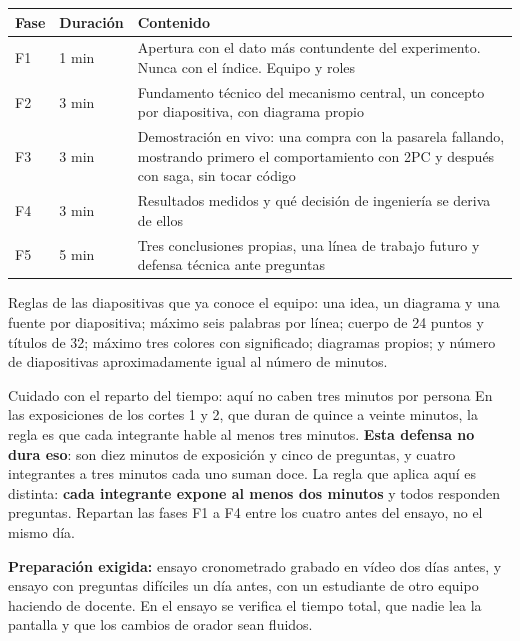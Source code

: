 \documentclass[11pt,a4paper]{article}
\begin{document}
	\begin{center}
		\small
		\begin{tabular}{@{}p{1.1cm}p{3.5cm}p{10.3cm}@{}}
			\toprule
			\textbf{Fase} & \textbf{Duración} & \textbf{Contenido} \\
			\midrule
			F1 & 1 min & Apertura con el dato más contundente del experimento. Nunca con el índice. Equipo y roles \\
			F2 & 3 min & Fundamento técnico del mecanismo central, un concepto por diapositiva, con diagrama propio \\
			F3 & 3 min & Demostración en vivo: una compra con la pasarela fallando, mostrando primero el comportamiento con 2PC y después con saga, sin tocar código \\
			F4 & 3 min & Resultados medidos y qué decisión de ingeniería se deriva de ellos \\
			F5 & 5 min & Tres conclusiones propias, una línea de trabajo futuro y defensa técnica ante preguntas \\
			\bottomrule
		\end{tabular}
	\end{center}
	
	Reglas de las diapositivas que ya conoce el equipo: una idea, un diagrama y una fuente por diapositiva; máximo seis palabras por línea; cuerpo de 24 puntos y títulos de 32; máximo tres colores con significado; diagramas propios; y número de diapositivas aproximadamente igual al número de minutos.
	
	\begin{avisoBox}{Cuidado con el reparto del tiempo: aquí no caben tres minutos por persona}
		En las exposiciones de los cortes 1 y 2, que duran de quince a veinte minutos, la regla es que cada integrante hable al menos tres minutos. \textbf{Esta defensa no dura eso}: son diez minutos de exposición y cinco de preguntas, y cuatro integrantes a tres minutos cada uno suman doce. La regla que aplica aquí es distinta: \textbf{cada integrante expone al menos dos minutos} y todos responden preguntas. Repartan las fases F1 a F4 entre los cuatro antes del ensayo, no el mismo día.
	\end{avisoBox}
	
	\textbf{Preparación exigida:} ensayo cronometrado grabado en vídeo dos días antes, y ensayo con preguntas difíciles un día antes, con un estudiante de otro equipo haciendo de docente. En el ensayo se verifica el tiempo total, que nadie lea la pantalla y que los cambios de orador sean fluidos.
	
\end{document}
